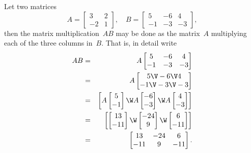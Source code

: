 \begin{example} 
Let two matrices
\begin{equation*}
A=\begin{bmatrix} 3 & 2\\ -2 & 1 \end{bmatrix},\quad
B=\begin{bmatrix} 5 & -6 & 4\\ -1 & -3 & -3 \end{bmatrix},
\end{equation*}
then the matrix multiplication~\(AB\) may be done as the matrix~\(A\) multiplying each of the three columns in~\(B\).
That is, in detail write
\begin{eqnarray*}
AB&=&A\begin{bmatrix} 5 & -6 & 4\\ -1 & -3 & -3 \end{bmatrix}
\\&=&A\begin{bmatrix} 5 \V -6 \V 4\\ -1 \V -3 \V -3 \end{bmatrix}
\\&=&\begin{bmatrix} A\begin{bmatrix} 5\\-1 \end{bmatrix} \W
A\begin{bmatrix} -6\\-3 \end{bmatrix} \W
A\begin{bmatrix} 4\\-3 \end{bmatrix} \end{bmatrix}
\\&=&\begin{bmatrix} \begin{bmatrix} 13\\-11 \end{bmatrix} \W
\begin{bmatrix} -24\\9 \end{bmatrix} \W
\begin{bmatrix}6\\-11 \end{bmatrix} \end{bmatrix}
\\&=&\begin{bmatrix}  13& -24&6\\-11 &9&-11\end{bmatrix}.

\end{eqnarray*}
\end{example}
